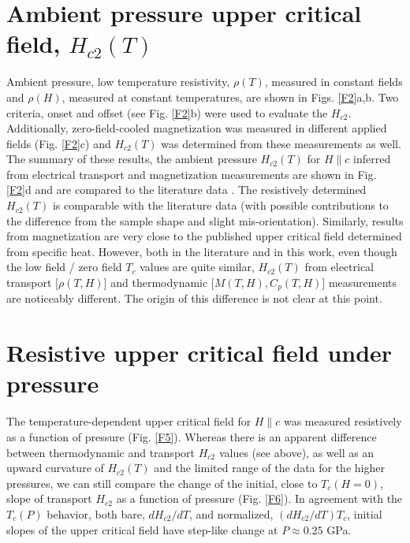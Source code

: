 \documentclass[aps,prb,preprint,groupedaddress,showpacs,amsmath,amssymb]{revtex4}
\begin{document}
\appendix

\section{Ambient pressure upper critical field, $H_{c2}(T)$}

Ambient pressure, low temperature resistivity, $\rho(T)$, measured  in  constant fields and $\rho(H)$, measured at  constant temperatures, are shown in Figs. \ref{F2}a,b. Two criteria, onset and offset (see Fig. \ref{F2}b) were used to evaluate the $H_{c2}$. Additionally, zero-field-cooled magnetization was measured in different applied fields (Fig. \ref{F2}c) and $H_{c2}(T)$ was determined from these measurements as well. The summary of these results, the ambient pressure $H_{c2}(T)$ for $H \| c$ inferred from electrical transport and magnetization measurements are shown in Fig. \ref{F2}d and are  compared to the literature data \cite{zha16a}. The resistively determined  $H_{c2}(T)$ is comparable with the literature data (with possible contributions to the difference from the sample shape and slight mis-orientation). Similarly, results from magnetization are very close to the published upper critical field determined from specific heat. However, both in the literature \cite{zha16a} and in this work, even though the low field / zero field $T_c$ values are quite similar, $H_{c2}(T)$ from electrical transport [$\rho(T,H)$] and thermodynamic [$M(T,H), C_p(T,H)$] measurements are noticeably different. The origin of this difference is not clear at this point.

\section{Resistive upper critical field under pressure}

The temperature-dependent upper critical field for $H \| c$ was measured resistively as a function of pressure (Fig. \ref{F5}). Whereas there is an apparent difference between thermodynamic and transport $H_{c2}$ values (see above), as well as an  upward curvature of $H_{c2}(T)$ and the limited range of the data for the higher pressures, we can still compare the change of the initial, close to $T_c(H=0)$, slope of transport $H_{c2}$ as a function of pressure (Fig. \ref{F6}). In agreement with the $T_c(P)$ behavior, both bare, $dH_{c2}/dT$, and normalized, $(dH_{c2}/ dT)T_c$,  initial slopes of the upper critical field have step-like change at $P \approx 0.25$ GPa. 
\end{document}
